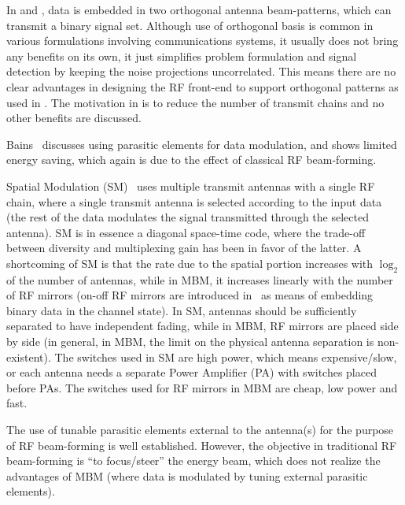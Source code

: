 In \cite{c1} and \cite{c2}, data is embedded in two orthogonal antenna beam-patterns, which  can transmit a binary signal set. Although use of orthogonal basis is common in various formulations involving communications systems, it usually does not bring any benefits on its own, it just simplifies problem formulation and signal detection by keeping the noise projections uncorrelated. This means there are no clear advantages in designing the RF front-end to support orthogonal patterns as used in \cite{c1,c2}. The motivation in \cite{c1,c2} is to reduce the number of transmit chains and no other benefits are discussed. 

Bains~\cite{c3} discusses using parasitic elements for data modulation, and shows limited energy saving, which again is due to the effect of classical RF beam-forming. 

Spatial Modulation (SM)~\cite{c4-new} uses multiple transmit antennas with a single RF chain, where a single transmit antenna is selected according to the input data (the rest of the data modulates the signal transmitted through the selected antenna). SM is in essence a diagonal space-time code, where the trade-off between diversity and multiplexing gain has been in favor of the latter. A shortcoming of SM is that the rate due to the spatial portion increases with $\log_2$ of the number of antennas, while in MBM, it increases linearly with the number of RF mirrors (on-off RF mirrors are introduced in~\cite{isit2014} as means of embedding binary data in the channel state). In SM, antennas should be sufficiently separated to have independent fading, while in MBM, RF mirrors are placed side by side (in general, in MBM, the limit on the physical antenna separation is non-existent). The switches used in SM are high power, which means expensive/slow, or each antenna needs a separate Power Amplifier (PA) with switches placed before PAs. The switches used for RF mirrors in MBM are cheap, low power and fast.

The use of tunable parasitic elements external to the antenna(s) for the purpose of RF beam-forming is well established. However, the objective in traditional RF beam-forming is “to focus/steer” the energy beam, which does not realize the advantages of MBM (where data is modulated by tuning external parasitic elements).

